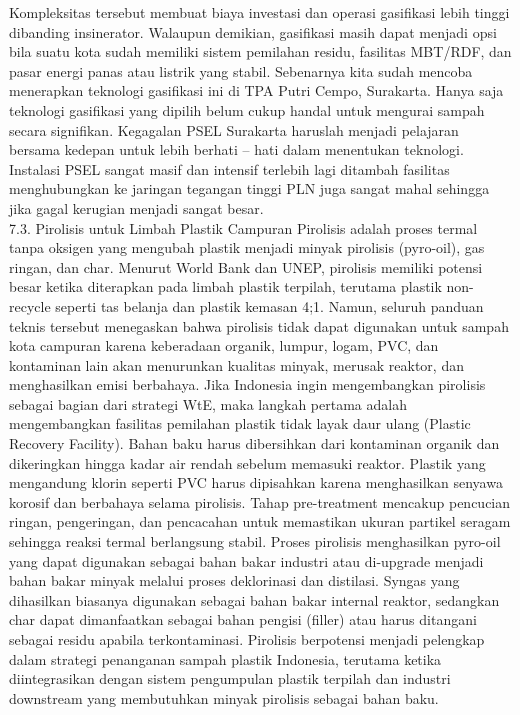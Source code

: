 \documentclass[
  letterpaper,
  DIV=11,
  numbers=noendperiod]{scrreprt}
\begin{document}
Kompleksitas tersebut membuat biaya investasi dan operasi gasifikasi
lebih tinggi dibanding insinerator. Walaupun demikian, gasifikasi masih
dapat menjadi opsi bila suatu kota sudah memiliki sistem pemilahan
residu, fasilitas MBT/RDF, dan pasar energi panas atau listrik yang
stabil. Sebenarnya kita sudah mencoba menerapkan teknologi gasifikasi
ini di TPA Putri Cempo, Surakarta. Hanya saja teknologi gasifikasi yang
dipilih belum cukup handal untuk mengurai sampah secara signifikan.
Kegagalan PSEL Surakarta haruslah menjadi pelajaran bersama kedepan
untuk lebih berhati -- hati dalam menentukan teknologi. Instalasi PSEL
sangat masif dan intensif terlebih lagi ditambah fasilitas menghubungkan
ke jaringan tegangan tinggi PLN juga sangat mahal sehingga jika gagal
kerugian menjadi sangat besar.\\
7.3. Pirolisis untuk Limbah Plastik Campuran Pirolisis adalah proses
termal tanpa oksigen yang mengubah plastik menjadi minyak pirolisis
(pyro-oil), gas ringan, dan char. Menurut World Bank dan UNEP, pirolisis
memiliki potensi besar ketika diterapkan pada limbah plastik terpilah,
terutama plastik non-recycle seperti tas belanja dan plastik kemasan
4;1. Namun, seluruh panduan teknis tersebut menegaskan bahwa pirolisis
tidak dapat digunakan untuk sampah kota campuran karena keberadaan
organik, lumpur, logam, PVC, dan kontaminan lain akan menurunkan
kualitas minyak, merusak reaktor, dan menghasilkan emisi berbahaya. Jika
Indonesia ingin mengembangkan pirolisis sebagai bagian dari strategi
WtE, maka langkah pertama adalah mengembangkan fasilitas pemilahan
plastik tidak layak daur ulang (Plastic Recovery Facility). Bahan baku
harus dibersihkan dari kontaminan organik dan dikeringkan hingga kadar
air rendah sebelum memasuki reaktor. Plastik yang mengandung klorin
seperti PVC harus dipisahkan karena menghasilkan senyawa korosif dan
berbahaya selama pirolisis. Tahap pre-treatment mencakup pencucian
ringan, pengeringan, dan pencacahan untuk memastikan ukuran partikel
seragam sehingga reaksi termal berlangsung stabil. Proses pirolisis
menghasilkan pyro-oil yang dapat digunakan sebagai bahan bakar industri
atau di-upgrade menjadi bahan bakar minyak melalui proses deklorinasi
dan distilasi. Syngas yang dihasilkan biasanya digunakan sebagai bahan
bakar internal reaktor, sedangkan char dapat dimanfaatkan sebagai bahan
pengisi (filler) atau harus ditangani sebagai residu apabila
terkontaminasi. Pirolisis berpotensi menjadi pelengkap dalam strategi
penanganan sampah plastik Indonesia, terutama ketika diintegrasikan
dengan sistem pengumpulan plastik terpilah dan industri downstream yang
membutuhkan minyak pirolisis sebagai bahan baku.
\end{document}
